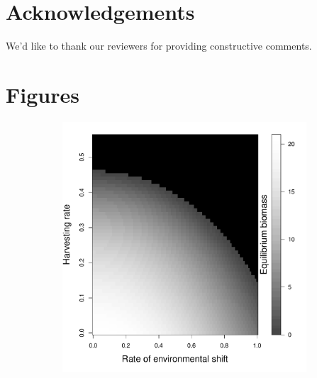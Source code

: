 \documentclass[12pt,english]{article}
\begin{document}
\begin{spacing}{1.9}
\begin{flushleft}
\section{ Acknowledgements}
We'd like to thank our reviewers for providing constructive comments. 



\section{Figures}

\begin{figure}[htbp]
\begin{subfigure}{3in}
\subcaption{\label{biomass}}
\includegraphics[width=\textwidth]{plots/eqbiomass.pdf}
\end{subfigure}
\begin{subfigure}{3in}
\subcaption{\label{rates}}

\end{subfigure}
\end{figure}
\end{flushleft}
\end{spacing}
\end{document}
